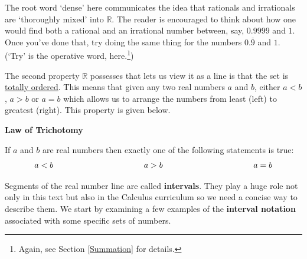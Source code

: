 \documentclass{ximera}
\begin{document}

 

The root word `dense' here communicates the idea that rationals and irrationals are `thoroughly mixed' into $\mathbb{R}$.   The reader is encouraged to think about how one would find both a rational and an irrational number between, say, $0.9999$ and $1$. Once you've done that, try doing the same thing for the numbers $0.\overline{9}$ and $1$. (`Try' is the operative word, here.\footnote{Again, see Section \ref{Summation} for details.})

 

The second property $\mathbb{R}$ possesses that lets us view it as a line is that the set is \href{http://en.wikipedia.org/wiki/Total_order}{\underline{totally ordered}}. This means that given any two real numbers $a$ and $b$, either $a < b$, $a > b$ or $a = b$ which allows us to arrange the numbers from least (left) to greatest (right). This property is given below.

 

\label{trichotomy}


\centerline{\textbf{Law of Trichotomy}}

If $a$ and $b$ are real numbers then exactly one of the following statements is true: \[ \begin{array}{lclcl} a < b & \hspace{1.25in} & a > b & \hspace{1.25in} & a = b \end{array} \]


 

Segments of the real number line are called \textbf{intervals}.  They play a huge role not only in this text but also in the Calculus curriculum so we need a concise way to describe them.  We start by examining a few examples of the \textbf{interval notation} associated with some specific sets of numbers.  
\end{document}
